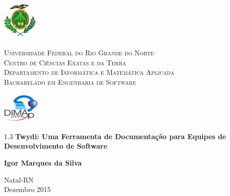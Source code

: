 
\begin{titlepage}
	\begin{center}

		\begin{minipage}{2cm}
			\begin{center}
				\includegraphics[width=1.7cm, height=2.0cm]{Imagens/Brasao-UFRN.jpg}
			\end{center}
		\end{minipage}
		\begin{minipage}{11cm}
			\begin{center}
				\begin{espacosimples}
					{\small \textsc{Universidade Federal do Rio Grande do Norte}			\\
							  \textsc{Centro de Ciências Exatas e da Terra}						\\
							  \textsc{Departamento de Informática e Matemática Aplicada}	\\
							  \textsc{Bacharelado em Engenharia de Software}}
				\end{espacosimples}
			\end{center}
		\end{minipage}
		\begin{minipage}{2cm}
			\begin{center}
				\includegraphics[width=1.8cm, height=1.5cm]{Imagens/Logotipo-DIMAp.jpg}
			\end{center}
		\end{minipage}

		\vspace{5cm}

		{\setlength{\baselineskip}%
		{1.3\baselineskip}
		{\LARGE \textbf{Twydi: Uma Ferramenta de Documentação para Equipes de Desenvolvimento de Software}}\par}

		\vspace{4cm}

		{\large \textbf{Igor Marques da Silva}}

		\vspace{7cm}

		Natal-RN\\Dezembro 2015
	\end{center}
\end{titlepage}
